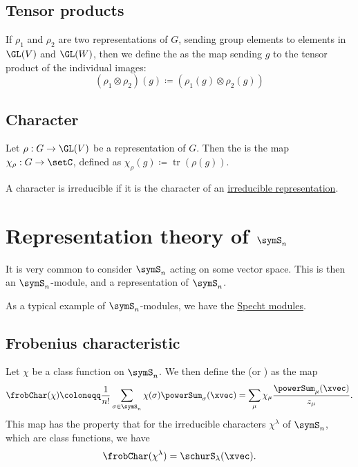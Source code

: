 \subsection[representationTensorProduct]{Tensor products}

If $\rho_1$ and $\rho_2$ are two representations of $G$, sending group
elements to elements in $\GL(V)$ and $\GL(W)$, then we define the
\label{tensorProductRepresentationDefinition}
as the map
sending $g$ to the tensor product of the individual images:
\[
(\rho_1 \otimes \rho_2)(g) \coloneqq (\rho_1(g) \otimes \rho_2(g))
\]

\subsection[representationCharacter]{Character}

Let $\rho: G \to \GL(V)$ be a representation of $G$.
Then the \label{representationCharacterDefinition} is the
map $\chi_{\rho}:G \to \setC$, defined as
$\chi_{\rho}(g) \coloneqq \operatorname{tr}(\rho(g))$.

A character is irreducible if it is the character of an
\hyperref[representationIrreducible]{irreducible representation}.


\section[SnRepresentationTheory]{Representation theory of $\symS_n$}

It is very common to consider $\symS_n$ acting on some vector space.
This is then an $\symS_n$-module, and a representation of $\symS_n$.

As a typical example of $\symS_n$-modules, we have the
\hyperref[spechtModules]{Specht modules}.


\subsection[frobeniusCharacteristic]{Frobenius characteristic}

Let $\chi$ be a class function on $\symS_n$.
We then define the 
(or \label{frobeniusImage})
as the map
\[
\frobChar(\chi) \coloneqq \frac{1}{n!} \sum_{\sigma \in \symS_n} \chi(\sigma) \powerSum_\sigma(\xvec)
= \sum_{\mu} \chi_\mu \frac{\powerSum_\mu(\xvec)}{z_\mu}.
\]
This map has the property that for the irreducible characters $\chi^\lambda$ of $\symS_n$,
which are class functions, we have
\[
\frobChar(\chi^\lambda) = \schurS_\lambda(\xvec).
\]

